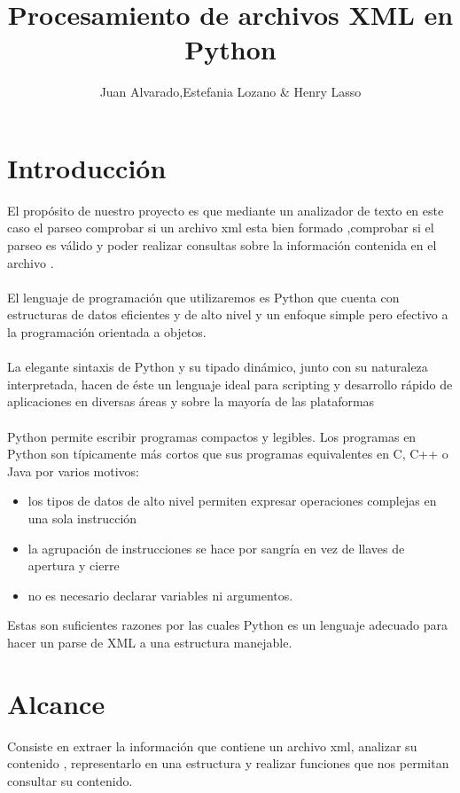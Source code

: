 \documentclass[11pt]{article} %
\title{Procesamiento de archivos  XML  en Python}
\author{Juan Alvarado,Estefania Lozano \&  Henry Lasso}
\begin{document}
\maketitle

\section{Introducción}
El propósito de nuestro proyecto es que  mediante un analizador de texto en este caso el parseo comprobar si un archivo xml esta bien formado ,comprobar si el parseo es válido y poder realizar consultas sobre la información contenida en el archivo .\\ \\
El lenguaje de programación que utilizaremos es Python que cuenta con estructuras de datos eficientes y de alto
nivel y un enfoque simple pero efectivo a la programación orientada a objetos.\\ \\
La elegante sintaxis de Python y su tipado dinámico, junto con su naturaleza interpretada, hacen de éste un lenguaje ideal para scripting y desarrollo rápido de aplicaciones en diversas áreas y sobre la mayoría de las plataformas\\ \\
Python permite escribir programas compactos y legibles. Los programas en Python son típicamente más cortos que sus
programas equivalentes en C, C++ o Java por varios motivos:
\begin{itemize}
\item los tipos de datos de alto nivel permiten expresar operaciones complejas en una sola instrucción
\item la agrupación de instrucciones se hace por sangría en vez de llaves de apertura y cierre
\item  no es necesario declarar variables ni argumentos.
\end{itemize}
Estas son suficientes razones por las cuales Python es un lenguaje adecuado para hacer un parse de XML a una estructura manejable.

\section{Alcance}
Consiste en extraer la información que contiene un archivo xml, analizar su contenido , representarlo en una estructura y realizar funciones que nos permitan consultar su contenido.
\end{document}

